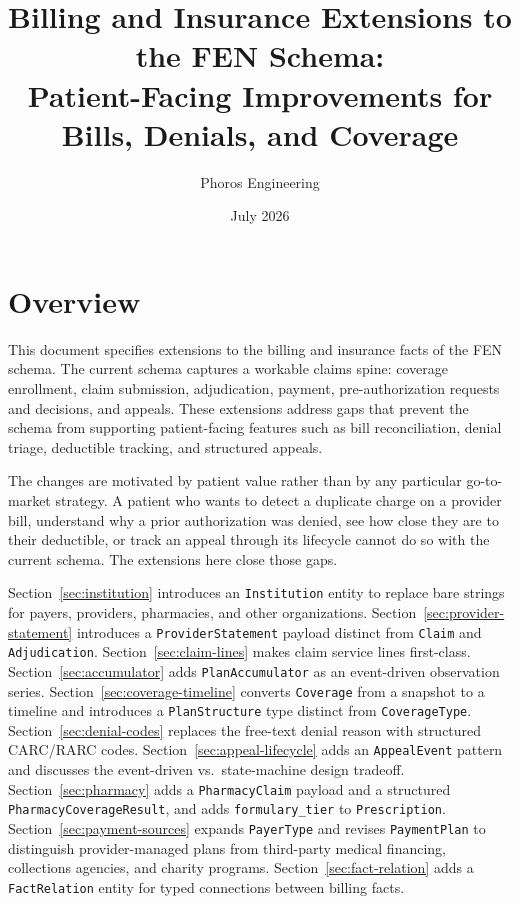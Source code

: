 \documentclass[11pt]{article}
\title{Billing and Insurance Extensions to the FEN Schema:\\
Patient-Facing Improvements for Bills, Denials, and Coverage}
\author{Phoros Engineering}
\date{July 2026}
\begin{document}
\maketitle

\section{Overview}

This document specifies extensions to the billing and insurance facts of the
FEN schema. The current schema captures a workable claims spine: coverage
enrollment, claim submission, adjudication, payment, pre-authorization
requests and decisions, and appeals. These extensions address gaps that
prevent the schema from supporting patient-facing features such as bill
reconciliation, denial triage, deductible tracking, and structured appeals.

The changes are motivated by patient value rather than by any particular
go-to-market strategy. A patient who wants to detect a duplicate charge on a
provider bill, understand why a prior authorization was denied, see how
close they are to their deductible, or track an appeal through its
lifecycle cannot do so with the current schema. The extensions here close
those gaps.

Section~\ref{sec:institution} introduces an \texttt{Institution} entity
to replace bare strings for payers, providers, pharmacies, and other
organizations. Section~\ref{sec:provider-statement} introduces a
\texttt{ProviderStatement} payload distinct from \texttt{Claim} and
\texttt{Adjudication}. Section~\ref{sec:claim-lines} makes claim service
lines first-class. Section~\ref{sec:accumulator} adds
\texttt{PlanAccumulator} as an event-driven observation series.
Section~\ref{sec:coverage-timeline} converts \texttt{Coverage} from a
snapshot to a timeline and introduces a \texttt{PlanStructure} type
distinct from \texttt{CoverageType}. Section~\ref{sec:denial-codes}
replaces the free-text denial reason with structured CARC/RARC codes.
Section~\ref{sec:appeal-lifecycle} adds an \texttt{AppealEvent} pattern
and discusses the event-driven vs.\ state-machine design tradeoff.
Section~\ref{sec:pharmacy} adds a \texttt{PharmacyClaim} payload and a
structured \texttt{PharmacyCoverageResult}, and adds
\texttt{formulary\_tier} to \texttt{Prescription}.
Section~\ref{sec:payment-sources} expands \texttt{PayerType} and revises
\texttt{PaymentPlan} to distinguish provider-managed plans from
third-party medical financing, collections agencies, and charity
programs. Section~\ref{sec:fact-relation} adds a \texttt{FactRelation}
entity for typed connections between billing facts.
\end{document}
